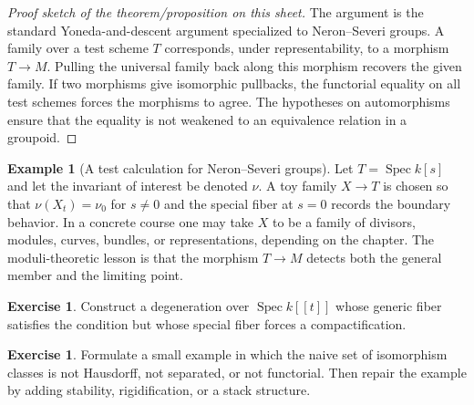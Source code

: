 \documentclass[11pt]{amsart}
\theoremstyle{definition}
\newtheorem{example}[theorem]{Example}
\newtheorem{exercise}[theorem]{Exercise}
\newcommand{\Spec}{\operatorname{Spec}}
\begin{document}
\begin{proof}[Proof sketch of the theorem/proposition on this sheet]
The argument is the standard Yoneda-and-descent argument specialized to Neron--Severi groups.  A family over a test scheme $T$ corresponds, under representability, to a morphism $T\to M$.  Pulling the universal family back along this morphism recovers the given family.  If two morphisms give isomorphic pullbacks, the functorial equality on all test schemes forces the morphisms to agree.  The hypotheses on automorphisms ensure that the equality is not weakened to an equivalence relation in a groupoid.
\end{proof}
\begin{example}[A test calculation for Neron--Severi groups]
Let $T=\Spec k[s]$ and let the invariant of interest be denoted $\nu$.  A toy family $X\to T$ is chosen so that $\nu(X_t)=\nu_0$ for $s\ne0$ and the special fiber at $s=0$ records the boundary behavior.  In a concrete course one may take $X$ to be a family of divisors, modules, curves, bundles, or representations, depending on the chapter.  The moduli-theoretic lesson is that the morphism $T\to M$ detects both the general member and the limiting point.
\end{example}
\begin{exercise}
Construct a degeneration over $\Spec k[[t]]$ whose generic fiber satisfies the condition but whose special fiber forces a compactification.
\end{exercise}
\begin{exercise}
Formulate a small example in which the naive set of isomorphism classes is not Hausdorff, not separated, or not functorial.  Then repair the example by adding stability, rigidification, or a stack structure.
\end{exercise}
\clearpage
\end{document}
